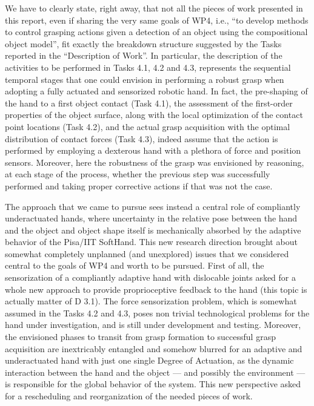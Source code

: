 \documentclass[a4paper,11pt,pdf]{pacmanreport}
\begin{document}
We have to clearly state, right away, that not all the pieces of work presented in this report, even if sharing the very same goals of WP4, i.e., ``to develop methods to control grasping actions given a detection of an object using the compositional object model'', fit exactly the breakdown structure suggested by the Tasks reported in the ``Description of Work''. In particular, the description of the activities to be performed in Tasks 4.1, 4.2 and 4.3, represents the sequential temporal stages that one could envision in performing a robust grasp when adopting a fully actuated and sensorized robotic hand. In fact, the pre-shaping of the hand to a first object contact (Task 4.1), the assessment of the first-order properties of the object surface, along with the local optimization of the contact point locations (Task 4.2), and the actual grasp acquisition with the optimal distribution of contact forces (Task 4.3), indeed assume that the action is performed by employing a dexterous hand with a plethora of force and position sensors. Moreover, here the robustness of the grasp was envisioned by reasoning, at each stage of the process, whether the previous step was successfully performed and taking proper corrective actions if that was not the case.

The approach that we came to pursue sees instead a central role of compliantly underactuated hands, where uncertainty in the relative pose between the hand and the object and object shape itself is mechanically absorbed by the adaptive behavior of the Pisa/IIT SoftHand. This new research direction brought about somewhat completely unplanned (and unexplored) issues that we considered central to the goals of WP4 and worth to be pursued. First of all, the sensorization of a compliantly adaptive hand with dislocable joints asked for a whole new approach to provide proprioceptive feedback to the hand (this topic is actually matter of D 3.1). The force sensorization problem, which is somewhat assumed in the Tasks 4.2 and 4.3, poses non trivial technological problems for the hand under investigation, and is still under development and testing. Moreover, the envisioned phases to transit from grasp formation to successful grasp acquisition are inextricably entangled and somehow blurred for an adaptive and underactuated hand with just one single Degree of Actuation, as the dynamic interaction between the hand and the object --- and possibly the environment --- is responsible for the global behavior of the system. This new perspective asked for a rescheduling and reorganization of the needed pieces of work.
\end{document}
